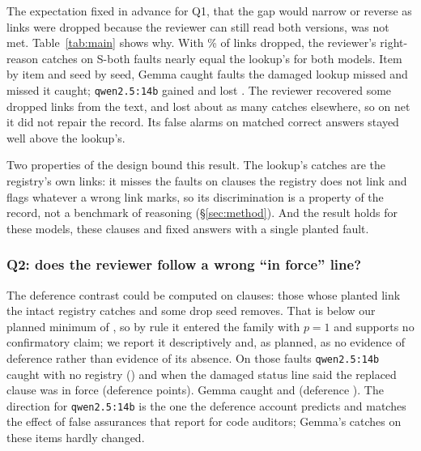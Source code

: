 The expectation fixed in advance for Q1, that the gap would narrow or reverse as links were dropped because the reviewer
can still read both versions, was not met. Table~\ref{tab:main} shows why. With \DamageDropFifty\% of links
dropped, the reviewer's right-reason catches on S-both faults nearly equal the lookup's for both models. Item by item
and seed by seed, Gemma caught \RecGainedDropFiftyGemma{} faults the damaged lookup missed and missed
\RecLostDropFiftyGemma{} it caught; \texttt{qwen2.5:14b} gained \RecGainedDropFiftyQwenFourteen{} and lost
\RecLostDropFiftyQwenFourteen. The reviewer recovered some dropped links from the text, and lost about as many
catches elsewhere, so on net it did not repair the record. Its false alarms on matched correct answers stayed well
above the lookup's.

Two properties of the design bound this result. The lookup's catches are the registry's own links: it misses
the faults on clauses the registry does not link and flags whatever a wrong link marks, so its discrimination is a
property of the record, not a benchmark of reasoning (\S\ref{sec:method}). And the result holds for these models,
these \NClauses{} clauses and fixed answers with a single planted fault.

\subsubsection{Q2: does the reviewer follow a wrong ``in force'' line?}
\label{sec:res-q2}
The deference contrast could be computed on \NDroppedClausesQwenFourteen{} clauses: those whose planted link the
intact registry catches and some drop seed removes. That is below our planned minimum of \MinClauses{}, so by
rule it entered the family with $p=1$ and supports no confirmatory claim; we report it descriptively and, as
planned, as no evidence of deference rather than evidence of its absence. On those faults
\texttt{qwen2.5:14b} caught \OwnCatchDroppedQwenFourteen{} with no registry () and
\CatchDroppedQwenFourteen{} when the damaged status line said the replaced clause was in force (deference
\DiffDeferQwenFourteen{} points). Gemma caught \OwnCatchDroppedGemma{} and \CatchDroppedGemma{} (deference
\DiffDeferGemma). The direction for \texttt{qwen2.5:14b} is the one the deference account predicts and matches the
effect of false assurances that \citet{liu2026trusting} report for code auditors; Gemma's catches on these items
hardly changed.

